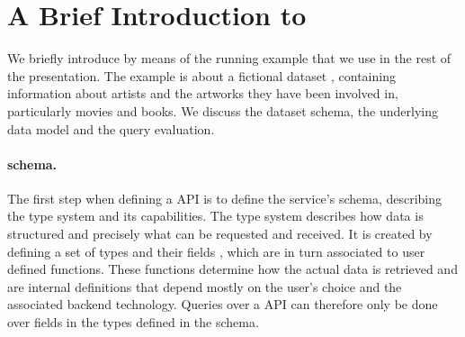 \section{A Brief Introduction to \gql}\label{sec:bg}


We briefly introduce \gql by means of the running example that we use in
the rest of the presentation.  The example is about a fictional
dataset \goodbois, containing information about artists and the
artworks they have been involved in, particularly movies and books.
We discuss the dataset schema, the underlying data model and the query
evaluation. 




\paragraph{\gql schema.}
The first step when defining a \gql API is to define the service's schema, 
describing the type system and its capabilities.
The type system describes how data is structured and 
precisely what can be requested and received. 
It is created by defining a set of types and their fields , which are in turn associated to user defined functions.
These functions determine how the actual data is retrieved and are internal definitions that
depend mostly on the user's choice and the associated backend technology.
Queries over a \gql API can therefore only be done over fields in the
types defined in the schema. 


